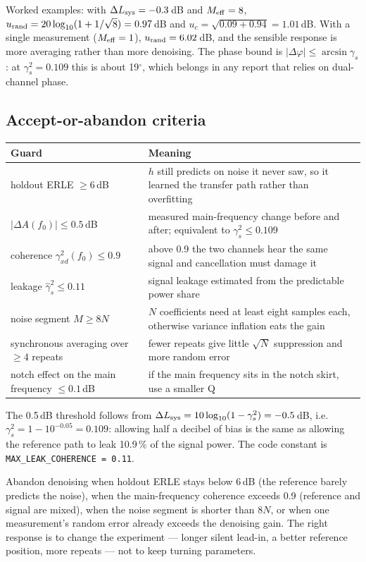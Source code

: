 \documentclass[UTF8,a4paper,12pt]{ctexart}
\begin{document}
Worked examples: with $\Delta L_{\rm sys}=-0.3$\,dB and $M_{\rm eff}=8$, $u_{\rm rand}=20\log_{10}(1+1/\sqrt8)=0.97$\,dB and $u_c=\sqrt{0.09+0.94}=1.01$\,dB. With a single measurement ($M_{\rm eff}=1$), $u_{\rm rand}=6.02$\,dB, and the sensible response is more averaging rather than more denoising. The phase bound is $|\Delta\varphi|\le\arcsin\gamma_s$: at $\gamma_s^2=0.109$ this is about 19$^\circ$, which belongs in any report that relies on dual-channel phase.

\subsection{Accept-or-abandon criteria}

\noindent\begin{longtable}{@{}p{}p{}@{}}
\toprule
Guard & Meaning \\
\midrule
\endhead
holdout ERLE $\ge 6$\,dB & $h$ still predicts on noise it never saw, so it learned the transfer path rather than overfitting \\
$|\Delta A(f_0)|\le 0.5$\,dB & measured main-frequency change before and after; equivalent to $\gamma_s^2\le 0.109$ \\
coherence $\gamma^2_{xd}(f_0)\le 0.9$ & above 0.9 the two channels hear the same signal and cancellation must damage it \\
leakage $\hat\gamma_s^2\le 0.11$ & signal leakage estimated from the predictable power share \\
noise segment $M\ge 8N$ & $N$ coefficients need at least eight samples each, otherwise variance inflation eats the gain \\
synchronous averaging over $\ge 4$ repeats & fewer repeats give little $\sqrt N$ suppression and more random error \\
notch effect on the main frequency $\le 0.1$\,dB & if the main frequency sits in the notch skirt, use a smaller Q \\
\bottomrule
\end{longtable}

The 0.5\,dB threshold follows from $\Delta L_{\rm sys}=10\log_{10}(1-\gamma_s^2)=-0.5$\,dB, i.e. $\gamma_s^2=1-10^{-0.05}=0.109$: allowing half a decibel of bias is the same as allowing the reference path to leak 10.9\,\% of the signal power. The code constant is \texttt{MAX\_LEAK\_COHERENCE = 0.11}.

Abandon denoising when holdout ERLE stays below 6\,dB (the reference barely predicts the noise), when the main-frequency coherence exceeds 0.9 (reference and signal are mixed), when the noise segment is shorter than $8N$, or when one measurement's random error already exceeds the denoising gain. The right response is to change the experiment --- longer silent lead-in, a better reference position, more repeats --- not to keep turning parameters.
\end{document}
